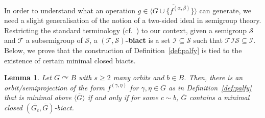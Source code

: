 \documentclass{article}
\newtheorem{lemma}[theorem]{Lemma}
\theoremstyle{remark}
\theoremstyle{definition}
\def\acts{\curvearrowright}
\begin{document}
In order to understand what an operation $g\in\overline{\langle G\cup\{f^{(\alpha, \beta)}\}\rangle}$ can generate, we need a slight generalisation of the notion of a two-sided ideal in semigroup theory. Restricting the standard terminology (cf.~\cite[Chapter 1.4]{kilp2011monoids}) to our context, given a semigroup $\mathcal{S}$ and $\mathcal{T}$ a subsemigroup of $\mathcal{S}$, a $(\mathcal{T}, \mathcal{S})$\textbf{-biact} is a set $\mathcal{I}\subseteq\mathcal{S}$ such that $\mathcal{T}\mathcal{I}\mathcal{S}\subseteq\mathcal{I}$. Below, we prove that the construction of Definition~\ref{def:palfy} is tied to the existence of certain minimal closed biacts. 



\begin{lemma}\label{lem:biacts} Let $G\acts B$ with $s\geq 2$ many orbits and $b\in B$. Then, there is an orbit\-/semiprojection  of the form $f^{(\gamma, \eta)}$ for $\gamma,\eta\in\overline{G}$ as in Definition~\ref{def:palfy} that is minimal above $\overline{\langle G\rangle}$ if and only if for some $c\sim b$, $\overline{G}$ contains a minimal closed $(\overline{G_{c}}, \overline{G})$-biact. 
\end{lemma}
\end{document}

